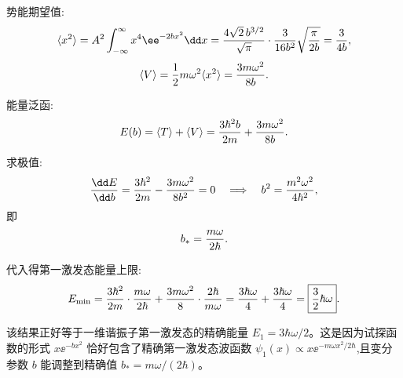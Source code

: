 \begin{solution}
势能期望值:
\[
\langle x^2\rangle=A^2\int_{-\infty}^\infty x^4\ee^{-2bx^2}\dd x
={4\sqrt2\,b^{3/2}\over\sqrt\pi}\cdot{3\over16b^2}\sqrt{\pi\over2b}
={3\over4b},
\]
\[
\langle V\rangle={1\over2}m\omega^2\langle x^2\rangle={3m\omega^2\over8b}.
\]

能量泛函:
\[
E(b)=\langle T\rangle+\langle V\rangle
={3\hbar^2b\over2m}+{3m\omega^2\over8b}.
\]

求极值:
\[
{\dd E\over\dd b}={3\hbar^2\over2m}-{3m\omega^2\over8b^2}=0
\quad\Longrightarrow\quad
b^2={m^2\omega^2\over4\hbar^2},
\]
即
\[
b_*={m\omega\over2\hbar}.
\]

代入得第一激发态能量上限:
\[
E_{\min}={3\hbar^2\over2m}\cdot{m\omega\over2\hbar}
+{3m\omega^2\over8}\cdot{2\hbar\over m\omega}
={3\hbar\omega\over4}+{3\hbar\omega\over4}
=\boxed{{3\over2}\hbar\omega}.
\]

该结果正好等于一维谐振子第一激发态的精确能量 $E_1=3\hbar\omega/2$。这是因为试探函数的形式 $x\ee^{-bx^2}$ 恰好包含了精确第一激发态波函数 $\psi_1(x)\propto x \ee^{-m\omega x^2/2\hbar}$,且变分参数 $b$ 能调整到精确值 $b_*=m\omega/(2\hbar)$。
\end{solution}

